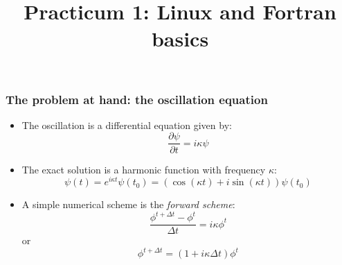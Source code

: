 \documentclass[aspectratio=43,9pt]{beamer}
\title{Practicum 1: Linux and Fortran basics}
\begin{document}
%
%
\begin{frame}[plain]
	\titlepage
\end{frame}
%
%
\begin{frame}
	\frametitle{The problem at hand: the oscillation equation}
	\begin{itemize}
		\item The oscillation is a differential equation given by:
			\begin{equation*}
				\frac{\partial \psi}{\partial t} = i \kappa \psi
			\end{equation*}
		\item The exact solution is a harmonic function with frequency $\kappa$:
			\begin{equation*}
				\psi(t)=e^{i\kappa t}\psi(t_0) = \left(\cos(\kappa t)+i\sin(\kappa t)\right)\psi(t_0)
			\end{equation*}
		\item A simple numerical scheme is the \emph{forward scheme}:
			\begin{equation*}
				\frac{\phi^{t+\Delta t}-\phi^t}{\Delta t}=i\kappa \phi^t
			\end{equation*}
			or
			\begin{equation*}
				\phi^{t+\Delta t}=(1+i\kappa\Delta t) \phi^t
			\end{equation*}			
	\end{itemize}
\end{frame}
%
%
\end{document}
